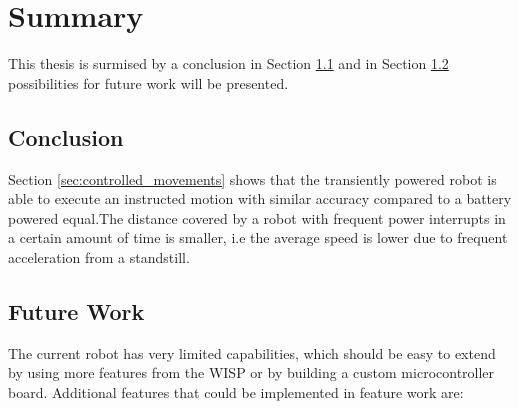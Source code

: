 \chapter{Summary}
\label{chp:summary}

This thesis is surmised by a conclusion in Section \ref{sec:conclusion} and in Section \ref{sec:limitations_future_work} possibilities for future work will be presented.

\section{Conclusion}
\label{sec:conclusion}

Section \ref{sec:controlled_movements} shows that the transiently powered robot is able to execute an instructed motion with similar accuracy compared to a battery powered equal.The distance covered by a robot with frequent power interrupts in a certain amount of time is smaller, i.e the average speed is lower due to frequent acceleration from a standstill.

\section{Future Work}
\label{sec:limitations_future_work}

The current robot has very limited capabilities, which should be easy to extend by using more features from the WISP or by building a custom microcontroller board.
Additional features that could be implemented in feature work are:

